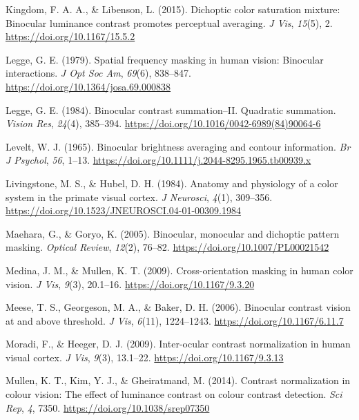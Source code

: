 \documentclass[
]{article}
\newlength{\cslhangindent}
\newlength{\cslentryspacingunit} %
\newenvironment{CSLReferences}[2] %
 {%
  \setlength{\parindent}{0pt}
  \ifodd #1
  \let\oldpar\par
  \def\par{\hangindent=\cslhangindent\oldpar}
  \fi
  \setlength{\parskip}{#2\cslentryspacingunit}
 }%
 {}
\begin{document}
\begin{CSLReferences}{1}{0}
\leavevmode{}%
Kingdom, F. A. A., \& Libenson, L. (2015). Dichoptic color saturation mixture: Binocular luminance contrast promotes perceptual averaging. \emph{J Vis}, \emph{15}(5), 2. \url{https://doi.org/10.1167/15.5.2}

\leavevmode{}%
Legge, G. E. (1979). Spatial frequency masking in human vision: Binocular interactions. \emph{J Opt Soc Am}, \emph{69}(6), 838--847. \url{https://doi.org/10.1364/josa.69.000838}

\leavevmode{}%
Legge, G. E. (1984). Binocular contrast summation--II. Quadratic summation. \emph{Vision Res}, \emph{24}(4), 385--394. \url{https://doi.org/10.1016/0042-6989(84)90064-6}

\leavevmode{}%
Levelt, W. J. (1965). Binocular brightness averaging and contour information. \emph{Br J Psychol}, \emph{56}, 1--13. \url{https://doi.org/10.1111/j.2044-8295.1965.tb00939.x}

\leavevmode{}%
Livingstone, M. S., \& Hubel, D. H. (1984). Anatomy and physiology of a color system in the primate visual cortex. \emph{J Neurosci}, \emph{4}(1), 309--356. \url{https://doi.org/10.1523/JNEUROSCI.04-01-00309.1984}

\leavevmode{}%
Maehara, G., \& Goryo, K. (2005). Binocular, monocular and dichoptic pattern masking. \emph{Optical Review}, \emph{12}(2), 76--82. \url{https://doi.org/10.1007/PL00021542}

\leavevmode{}%
Medina, J. M., \& Mullen, K. T. (2009). Cross-orientation masking in human color vision. \emph{J Vis}, \emph{9}(3), 20.1--16. \url{https://doi.org/10.1167/9.3.20}

\leavevmode{}%
Meese, T. S., Georgeson, M. A., \& Baker, D. H. (2006). Binocular contrast vision at and above threshold. \emph{J Vis}, \emph{6}(11), 1224--1243. \url{https://doi.org/10.1167/6.11.7}

\leavevmode{}%
Moradi, F., \& Heeger, D. J. (2009). Inter-ocular contrast normalization in human visual cortex. \emph{J Vis}, \emph{9}(3), 13.1--22. \url{https://doi.org/10.1167/9.3.13}

\leavevmode{}%
Mullen, K. T., Kim, Y. J., \& Gheiratmand, M. (2014). Contrast normalization in colour vision: The effect of luminance contrast on colour contrast detection. \emph{Sci Rep}, \emph{4}, 7350. \url{https://doi.org/10.1038/srep07350}


\end{CSLReferences}
\end{document}
